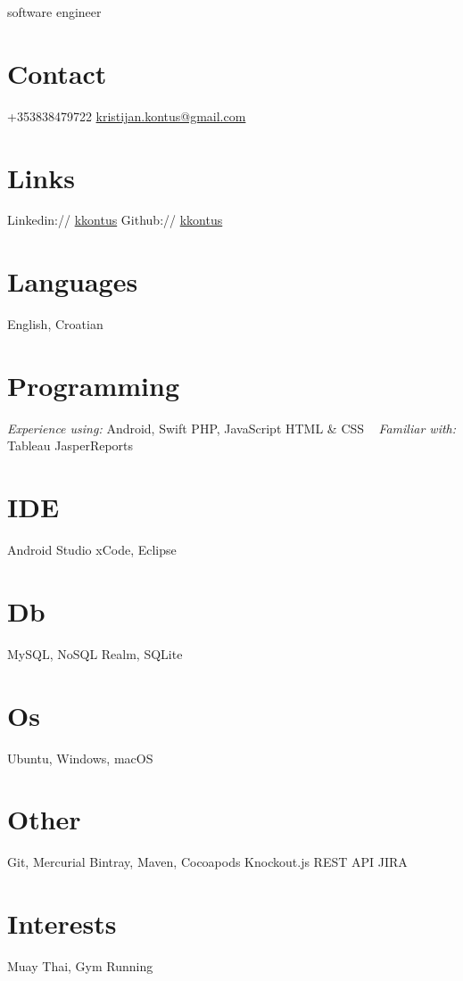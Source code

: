 \documentclass[print]{cv}
\begin{document}
{software engineer}
       
\begin{aside}
	\section{Contact}
	+353838479722
	\href{mailto:kristijan.kontus@gmail.com}{kristijan.kontus@gmail.com}  
	\section{Links}  
	Linkedin:// \href{https://www.linkedin.com/in/kkontus}{kkontus}
	Github:// \href{https://www.github.com/kkontus}{kkontus}
	\section{Languages}
	English, Croatian
	\section{Programming}
	\emph{Experience using:}
	Android, Swift
	PHP, JavaScript
	HTML \& CSS
	~     
	\emph{Familiar with:}
	Tableau
	JasperReports
	\section{IDE}
	Android Studio
	xCode, Eclipse
	\section{Db}
	MySQL, NoSQL
	Realm, SQLite
	\section{Os}
	Ubuntu, Windows, macOS
	\section{Other}
	Git, Mercurial
	Bintray, Maven, Cocoapods
	Knockout.js
	REST API
	JIRA
	\section{Interests}
	Muay Thai, Gym
	Running
\end{aside}
\end{document}
